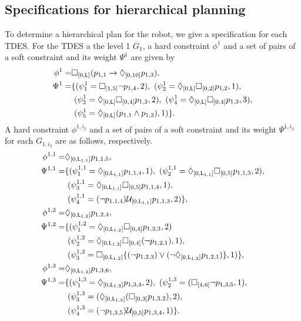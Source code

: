 \documentclass{article}
\newcommand{\Len}{{\sf L}}
\newcommand{\U}[1]{\mathcal{U}_{[#1]}}
\newcommand{\F}[1]{\Diamond_{[#1]}}
\newcommand{\G}[1]{\Box_{[#1]}}
\begin{document}
\subsection{Specifications for hierarchical planning}
%
To determine a hierarchical plan for the robot, we give a specification for each TDES.
For the TDES a the level 1 $\overline{G}_1$, a hard constraint $\phi^1$ and a set of pairs of a soft constraint and its weight $\Psi^1$ are given by
\begin{align}
\phi^1=&\G{0,\Len}(p_{1,1}\to\F{0,10}p_{1,3}), \notag \\
\Psi^1=&\{
(\psi^1_1=\G{1,5}\lnot p_{1,4}, 2), ~
(\psi^1_2=\F{0,\Len}\G{0,2}p_{1,2}, 1),\notag\\&~
(\psi^1_3=\F{0,\Len}\G{0,4}p_{1,2}, 2),~
(\psi^1_4=\F{0,\Len}\G{0,4}p_{1,3}, 3),\notag\\&~
(\psi^1_5=\F{0,\Len}(p_{1,1}\land p_{1,2}),1)
\}.\notag
\end{align}
%
A hard constraint $\phi^{1,i_2}$ and a set of pairs of a soft constraint and its weight $\Psi^{1,i_2}$ for each $G_{1,i_2}$ are as follows, respectively.
\begin{align}
\phi^{1,1}=&\F{0,\Len_{1,1}}p_{1,1,5},\notag \\
\Psi^{1,1} 
=&\{
(\psi^{1,1}_{1} =\F{0,\Len_{1,1}}p_{1,1,4}, 1),~
(\psi^{1,1}_{2} =\F{0,\Len_{1,1}}\G{0,5}p_{1,1,3},2),\notag\\
&~(\psi^{1,1}_{3} =\F{0,\Len_{1,1}}\G{0,5}p_{1,1,4},1), \notag\\
&~(\psi^{1,1}_{4} =(\lnot p_{1,1,4}) \U{0,\Len_{1,1}}p_{1,1,3}, 2)
\} ,\notag
\\
\phi^{1,2}=&\F{0,\Len_{1,2}}p_{1,2,4},\notag \\
\Psi^{1,2}
=&\{
(\psi^{1,2}_{1}=\F{0,\Len_{1,2}}\G{0,4}p_{1,2,3},2)\notag\\
&~
(\psi^{1,2}_{2}=\F{0,\Len_{1,2}}\G{0,4}(\lnot p_{1,2,1}),1),\notag\\
&~(\psi^{1,2}_{3}=\G{0,\Len_{1,2}}\{(\lnot p_{1,2,3}) \lor (\lnot\F{0,\Len_{1,2}}p_{1,2,1})\},1)
\},\notag
\\ %
\phi^{1,3}=&\F{0,\Len_{1,3}}p_{1,3,6},\notag \\
\Psi^{1,3}
=&\{
(\psi^{1,3}_{1}=\F{0,\Len_{1,3}}p_{1,3,4}, 2),~
(\psi^{1,3}_{2}=(\G{4,6}\lnot p_{1,3,5}, 1),\notag \\&~
(\psi^{1,3}_{3}=(\F{0,\Len_{1,3}}(\G{0,3}p_{1,3,2}), 2),\notag \\&~
(\psi^{1,3}_{4}=(\lnot p_{1,3,5})\U{0,5}p_{1,3,4}, 1)
\} .
\notag
\end{align}
\end{document}
